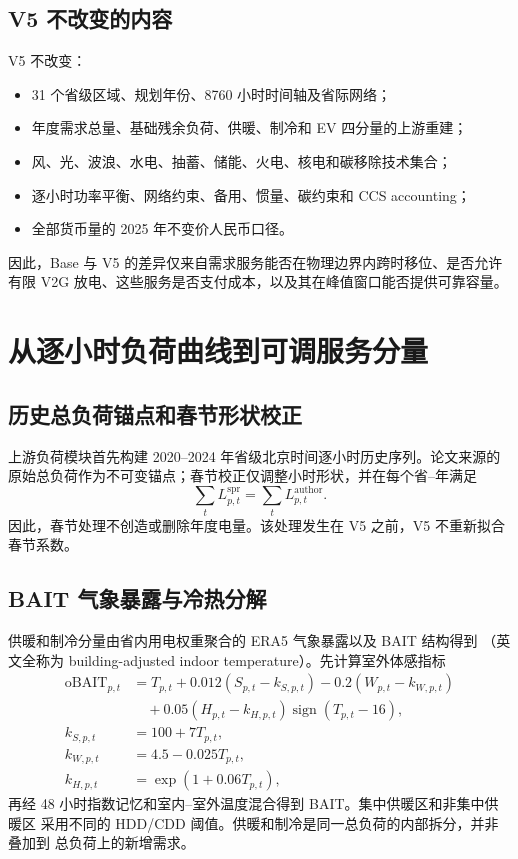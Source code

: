 \documentclass[UTF8,fontset=fandol,12pt]{ctexart}
\begin{document}
\subsection{V5 不改变的内容}

V5 不改变：
\begin{itemize}
  \item 31 个省级区域、规划年份、8760 小时时间轴及省际网络；
  \item 年度需求总量、基础残余负荷、供暖、制冷和 EV 四分量的上游重建；
  \item 风、光、波浪、水电、抽蓄、储能、火电、核电和碳移除技术集合；
  \item 逐小时功率平衡、网络约束、备用、惯量、碳约束和 CCS accounting；
  \item 全部货币量的 2025 年不变价人民币口径。
\end{itemize}

因此，Base 与 V5 的差异仅来自需求服务能否在物理边界内跨时移位、是否允许
有限 V2G 放电、这些服务是否支付成本，以及其在峰值窗口能否提供可靠容量。

\section{从逐小时负荷曲线到可调服务分量}

\subsection{历史总负荷锚点和春节形状校正}

上游负荷模块首先构建 2020--2024 年省级北京时间逐小时历史序列。论文来源的
原始总负荷作为不可变锚点；春节校正仅调整小时形状，并在每个省--年满足
\begin{equation}
  \sum_t L^{\mathrm{spr}}_{p,t}
  =
  \sum_t L^{\mathrm{author}}_{p,t}.
\end{equation}
因此，春节处理不创造或删除年度电量。该处理发生在 V5 之前，V5 不重新拟合
春节系数。

\subsection{BAIT 气象暴露与冷热分解}

供暖和制冷分量由省内用电权重聚合的 ERA5 气象暴露以及 BAIT 结构得到
（英文全称为 building-adjusted indoor temperature）。先计算室外体感指标
\begin{align}
  \mathrm{oBAIT}_{p,t}
  &=
  T_{p,t}
  +0.012\!\left(S_{p,t}-k_{S,p,t}\right)
  -0.2\!\left(W_{p,t}-k_{W,p,t}\right) \nonumber\\
  &\quad
  +0.05\!\left(H_{p,t}-k_{H,p,t}\right)
  \operatorname{sign}(T_{p,t}-16),\\
  k_{S,p,t}&=100+7T_{p,t},\\
  k_{W,p,t}&=4.5-0.025T_{p,t},\\
  k_{H,p,t}&=\exp(1+0.06T_{p,t}),
\end{align}
再经 48 小时指数记忆和室内--室外温度混合得到 BAIT。集中供暖区和非集中供暖区
采用不同的 HDD/CDD 阈值。供暖和制冷是同一总负荷的内部拆分，并非叠加到
总负荷上的新增需求。
\end{document}
